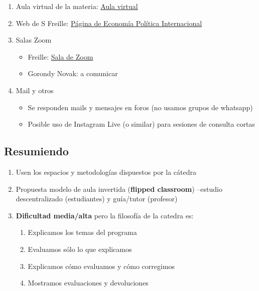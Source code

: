 \documentclass[
]{article}
\providecommand{\tightlist}{%
  \setlength{\itemsep}{0pt}\setlength{\parskip}{0pt}}
\begin{document}
\begin{enumerate}
\def\labelenumi{\arabic{enumi}.}
\tightlist
\item
  Aula virtual de la materia:
  \href{https://campusvirtual.ucc.edu.ar/course/view.php?id=2037}{Aula
  virtual}
\item
  Web de S Freille: \href{https://sfreille.weebly.com/epin.html}{Página
  de Economía Política Internacional}
\item
  Salas Zoom

  \begin{itemize}
  \tightlist
  \item
    Freille:
    \href{https://us02web.zoom.us/j/86047575122?pwd=YmFQSnRCcnNqenVzMVV4Z1lMODFnZz09}{Sala
    de Zoom}
  \item
    Gorondy Novak: a comunicar
  \end{itemize}
\item
  Mail y otros

  \begin{itemize}
  \tightlist
  \item
    Se responden mails y mensajes en foros (no usamos grupos de
    whatsapp)
  \item
    Posible uso de Instagram Live (o similar) para sesiones de consulta
    cortas
  \end{itemize}
\end{enumerate}

\hypertarget{resumiendo}{%
\subsection{Resumiendo}\label{resumiendo}}

\begin{enumerate}
\def\labelenumi{\arabic{enumi}.}
\tightlist
\item
  Usen los espacios y metodologías dispuestos por la cátedra
\item
  Propuesta modelo de aula invertida (\textbf{flipped classroom})
  --estudio descentralizado (estudiantes) y guía/tutor (profesor)
\item
  \textbf{Dificultad media/alta} pero la filosofía de la catedra es:

  \begin{enumerate}
  \def\labelenumii{\arabic{enumii}.}
  \tightlist
  \item
    Explicamos los temas del programa
  \item
    Evaluamos sólo lo que explicamos
  \item
    Explicamos cómo evaluamos y cómo corregimos
  \item
    Mostramos evaluaciones y devoluciones
  \end{enumerate}
\end{enumerate}
\end{document}
